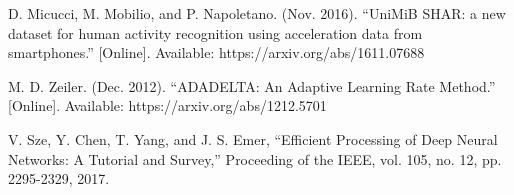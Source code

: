 \documentclass[twoside,twocolumn]{article}
\begin{document}
\begin{thebibliography}{00}
 D. Micucci, M. Mobilio, and P. Napoletano. (Nov. 2016). ``UniMiB SHAR: a new dataset for human activity recognition using acceleration data from smartphones.'' [Online]. Available: https://arxiv.org/abs/1611.07688

 M. D. Zeiler. (Dec. 2012). ``ADADELTA: An Adaptive Learning Rate Method.'' [Online]. Available: https://arxiv.org/abs/1212.5701

 V. Sze, Y. Chen, T. Yang, and J. S. Emer, ``Efficient Processing of Deep Neural Networks: {A} Tutorial and Survey,'' Proceeding of the IEEE, vol. 105, no. 12, pp. 2295-2329, 2017.

\end{thebibliography}
\end{document}
